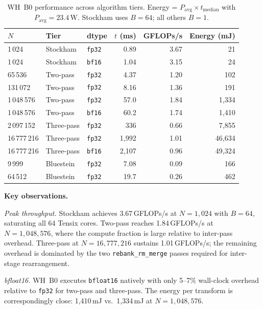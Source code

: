 \documentclass[conference]{IEEEtran}
\begin{document}
\begin{table}[t]
  \caption{WH~B0 performance across algorithm tiers. Energy = $P_{\mathrm{avg}}
           \times t_{\mathrm{median}}$ with $P_{\mathrm{avg}} = 23.4$\,W.
           Stockham uses $B=64$; all others $B=1$.}
  \label{tab:perf}
  \centering
  \small
  \begin{tabular}{lllrrr}
    \toprule
    $N$ & Tier & dtype & $t$ (ms) & GFLOPs/s & Energy (mJ) \\
    \midrule
    1\,024   & Stockham & \texttt{fp32} & 0.89  & 3.67 & 21  \\
    1\,024   & Stockham & \texttt{bf16} & 1.04  & 3.15 & 24  \\
    65\,536  & Two-pass & \texttt{fp32} & 4.37  & 1.20 & 102 \\
    131\,072 & Two-pass & \texttt{fp32} & 8.16  & 1.36 & 191 \\
    1\,048\,576 & Two-pass & \texttt{fp32} & 57.0 & 1.84 & 1{,}334 \\
    1\,048\,576 & Two-pass & \texttt{bf16} & 60.2 & 1.74 & 1{,}410 \\
    2\,097\,152 & Three-pass & \texttt{fp32} & 336 & 0.66 & 7{,}855 \\
    16\,777\,216 & Three-pass & \texttt{fp32} & 1{,}992 & 1.01 & 46{,}634 \\
    16\,777\,216 & Three-pass & \texttt{bf16} & 2{,}107 & 0.96 & 49{,}324 \\
    9\,999   & Bluestein & \texttt{fp32} & 7.08  & 0.09 & 166 \\
    64\,512  & Bluestein & \texttt{fp32} & 19.7  & 0.26 & 462 \\
    \bottomrule
  \end{tabular}
\end{table}

\textbf{Key observations.}

\textit{Peak throughput.} Stockham achieves 3.67\,GFLOPs/s at $N = 1{,}024$
with $B = 64$, saturating all 64 Tensix cores. Two-pass reaches 1.84\,GFLOPs/s
at $N = 1{,}048{,}576$, where the compute fraction is large relative to
inter-pass overhead. Three-pass at $N = 16{,}777{,}216$ sustains 1.01\,GFLOPs/s;
the remaining overhead is dominated by the two \texttt{rebank\_rm\_merge}
passes required for inter-stage rearrangement.

\textit{bfloat16.} WH~B0 executes \texttt{bfloat16} natively with only
5--7\% wall-clock overhead relative to \texttt{fp32} for two-pass and
three-pass. The energy per transform is correspondingly close: 1{,}410\,mJ
vs.\ 1{,}334\,mJ at $N = 1{,}048{,}576$.
\end{document}
